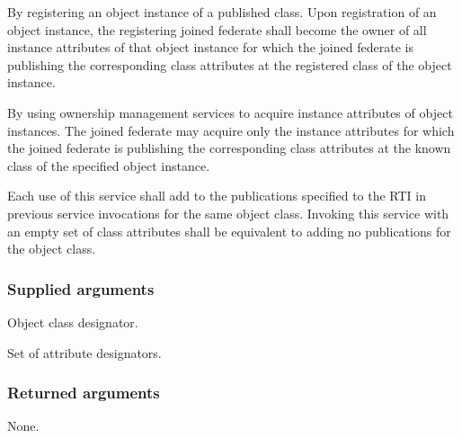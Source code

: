\begin{compactstdpage}
    \begin{stddashlist}
        \item By registering an object instance of a published class. Upon registration of an object instance, the registering joined federate shall become the owner of all instance attributes of that object instance for which the joined federate is publishing the corresponding class attributes at the registered class of the object instance.
        \item By using ownership management services to acquire instance attributes of object instances. The joined federate may acquire only the instance attributes for which the joined federate is publishing the corresponding class attributes at the known class of the specified object instance.
    \end{stddashlist}

    Each use of this service shall add to the publications specified to the RTI in previous service invocations for the same object class. Invoking this service with an empty set of class attributes shall be equivalent to adding no publications for the object class.

    \subsubsection{Supplied arguments}
    \begin{stdalphalist}
        \item Object class designator.
        \item Set of attribute designators.
    \end{stdalphalist}

    \subsubsection{Returned arguments}
    \begin{stdalphalist}
        \item None.
    \end{stdalphalist}
\end{compactstdpage}

\clearpage

